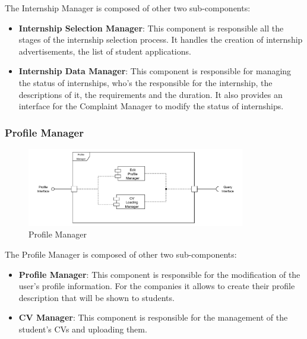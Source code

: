 \par The Internship Manager is composed of other two sub-components:
\begin{itemize}
      \item \textbf{Internship Selection Manager}: This component is responsible all the stages of the internship selection process.
            It handles the creation of internship advertisements, the list of student applications.
      \item \textbf{Internship Data Manager}: This component is responsible for managing the status of internships,
            who's the responsible for the internship, the descriptions of it, the requirements and the duration.
            It also provides an interface for the Complaint Manager to modify the status of internships.
\end{itemize}

\subsubsection{Profile Manager}
\label{subsub:profile-manager}%

\begin{figure}[H]
      \centering
      \includegraphics[width=0.85\textwidth]{Images/Profile_Architecture.pdf}
      \caption{Profile Manager}
      \label{profile-manager-arch}
\end{figure}

\par The Profile Manager is composed of other two sub-components:
\begin{itemize}
      \item \textbf{Profile Manager}: This component is responsible for the modification of the user's profile information.
            For the companies it allows to create their profile description that will be shown to students.
      \item \textbf{CV Manager}: This component is responsible for the management of the student's CVs and uploading them.
\end{itemize}

